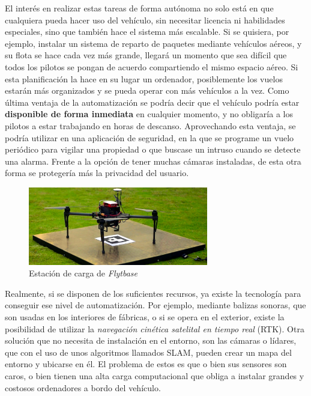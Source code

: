 El interés en realizar estas tareas de forma autónoma no solo está en que cualquiera pueda hacer uso del vehículo, sin necesitar licencia ni habilidades especiales, sino que también hace el sistema más escalable. Si se quisiera, por ejemplo, instalar un sistema de reparto de paquetes mediante vehículos aéreos, y su flota se hace cada vez más grande, llegará un momento que sea difícil que todos los pilotos se pongan de acuerdo compartiendo el mismo espacio aéreo. Si esta planificación la hace en su lugar un ordenador, posiblemente los vuelos estarán más organizados y se pueda operar con más vehículos a la vez. Como última ventaja de la automatización se podría decir que el vehículo podría estar \textbf{disponible de forma inmediata} en cualquier momento, y no obligaría a los pilotos a estar trabajando en horas de descanso. Aprovechando esta ventaja, se podría utilizar en una aplicación de seguridad, en la que se programe un vuelo periódico para vigilar una propiedad o que buscase un intruso cuando se detecte una alarma. Frente a la opción de tener muchas cámaras instaladas, de esta otra forma se protegería más la privacidad del usuario.
\begin{figure}[b]
\includegraphics[width=0.7\textwidth]{introduccion/flytbase_en.jpg}
\caption{Estación de carga de \textit{Flytbase}}
\label{fig:flyt}
\end{figure}


Realmente, si se disponen de los suficientes recursos, ya existe la tecnología para conseguir ese nivel de automatización. Por ejemplo, mediante balizas sonoras, que son usadas en los interiores de fábricas, o si se opera en el exterior, existe la posibilidad de utilizar la \textit{navegación cinética satelital en tiempo real} (RTK). Otra solución que no necesita de instalación en el entorno, son las cámaras o lídares, que con el uso de unos algoritmos llamados SLAM, pueden crear un mapa del entorno y ubicarse en él. El problema de estos es que o bien sus sensores son caros, o bien tienen una alta carga computacional que obliga a instalar grandes y costosos ordenadores a bordo del vehículo. 


